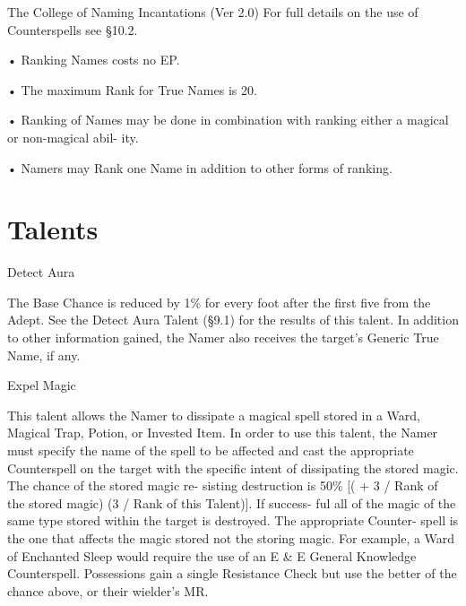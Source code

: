 \begin{Chapter}{The College of Naming Incantations (Ver 2.0)}
For  full  details  on  the  use  of  Counterspells  see 
§10.2. 

• Ranking Names costs no EP.  

• The maximum Rank for True Names is 20.  

•  Ranking  of  Names  may  be  done  in  combination 
with ranking either a magical or non-magical abil-
ity.  

• Namers may Rank one Name in addition to other 
forms of ranking. 


\section{Talents}

\begin{talent}[T-1]{Detect Aura }

\begin{effects}
 The  Base  Chance  is  reduced  by  1\%  for 
every  foot  after  the  first  five  from  the  Adept.  See 
the Detect Aura Talent (§9.1) for the results of this 
talent.  In  addition  to  other  information  gained,  the 
Namer  also  receives  the  target’s  Generic  True 
Name, if any. 

\end{effects}
\end{talent}

\begin{talent}[T-2]{Expel Magic }

\begin{effects}
This talent allows the Namer to dissipate a 
magical  spell  stored  in  a  Ward,  Magical  Trap, 
Potion, or Invested Item. In order to use this talent, 
the Namer must specify the name of the spell to be 
affected  and  cast  the  appropriate  Counterspell  on 
the target with the specific intent of dissipating the 
stored  magic.  The  chance  of  the  stored  magic  re-
sisting  destruction  is  50\%  [(  +  3  /  Rank  of  the 
stored magic) (3 / Rank of this Talent)]. If success-
ful all of the magic of the same type stored within 
the  target  is  destroyed.  The  appropriate  Counter-
spell is the one that affects the magic stored not the 
storing  magic.  For  example,  a  Ward  of  Enchanted 
Sleep  would  require  the  use  of  an  E  \&  E  General 
Knowledge Counterspell. Possessions gain a single 
Resistance  Check  but  use  the  better  of  the  chance 
above, or their wielder’s MR. 


\end{effects}
\end{talent}
\end{Chapter}
